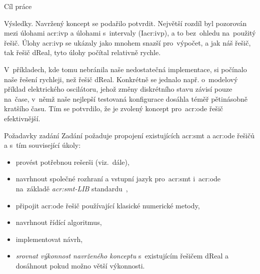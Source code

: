\documentclass[thesis=M,czech]{FITthesis}[2012/06/26]
\newcommand{\acrlabel}[1]{acr:#1}
\newcommand{\acr}[1]{\acrshort{\acrlabel{#1}}}
\newcommand{\hl}[1]{\textit{#1}}
\newcommand{\name}[1]{\hl{#1}}
\newcommand{\cit}[1]{\cite{#1}}
\begin{document}
\begin{introduction}
\begin{section}{Cíl práce}

\begin{paragraph}{Výsledky.}\label{p:intro:goal:results}
Navržený koncept se podařilo potvrdit.
Největší rozdíl byl pozorován
mezi úlohami \acr{ivp} a úlohami s~intervaly
(I\acr{ivp}), a to bez~ohledu
na~použitý řešič.
Úlohy \acr{ivp} se ukázaly jako mnohem
snazší pro~výpočet,
a jak náš řešič, tak řešič dReal,
tyto úlohy počítal relativně rychle.

V~příkladech, kde tomu nebránila
naše nedostatečná implementace,
si počínalo naše řešení rychleji, než řešič dReal.
Konkrétně se jednalo např. o~modelový příklad
elektrického oscilátoru, jehož změny diskrétního stavu
závisí pouze na~čase,
v~němž naše nejlepší testovaná konfigurace
dosáhla téměř pětinásobně kratšího času.
Tím se potvrdilo,
že je zvolený koncept pro~\acr{ode} řešič efektivnější.
\end{paragraph} %


\end{section} %


\begin{section}{Požadavky zadání}\label{s:intro:req}
Zadání požaduje propojení existujících \acr{smt} a \acr{ode} řešičů
a s~tím související úkoly:
\begin{itemize}
\item provést potřebnou rešerši (viz.~dále),
\item navrhnout společné rozhraní
   a vstupní jazyk pro~\acr{smt} i~\acr{ode}
   na~základě \name{\acr{smt}-LIB} standardu~\cit{smtlib},
\item připojit \acr{ode} řešič používající klasické numerické metody,
\item navrhnout řídící algoritmus,
\item implementovat návrh,
\item \hl{srovnat výkonnost navrženého konceptu}
   s~existujícím řešičem dReal a dosáhnout pokud možno větší výkonnosti.
\end{itemize}



\end{section}
\end{introduction}
\end{document}
